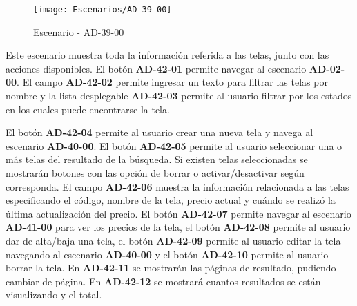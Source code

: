 \begin{figure}[H]
\centering
\texttt{[image: Escenarios/AD-39-00]}
\caption{Escenario - AD-39-00}
\label{fig:AD-39-00}
\end{figure}

Este escenario muestra toda la información referida a las telas, junto con las acciones disponibles.
El botón \textbf{AD-42-01} permite navegar al escenario \textbf{AD-02-00}. El campo \textbf{AD-42-02} permite ingresar un texto para filtrar las telas por nombre y la lista desplegable \textbf{AD-42-03} permite al usuario filtrar por los estados en los cuales puede encontrarse la tela.

El botón \textbf{AD-42-04} permite al usuario crear una nueva tela y navega al escenario \textbf{AD-40-00}.
El botón \textbf{AD-42-05} permite al usuario seleccionar una o más telas del resultado de la búsqueda. Si existen telas seleccionadas se mostrarán botones con las opción de borrar o activar/desactivar según corresponda. El campo \textbf{AD-42-06} muestra la información relacionada a las telas especificando el código, nombre de la tela, precio actual y cuándo se realizó la última actualización del precio. El botón \textbf{AD-42-07} permite navegar al escenario \textbf{AD-41-00} para ver los precios de la tela, el botón \textbf{AD-42-08} permite al usuario dar de alta/baja una tela, el botón \textbf{AD-42-09} permite al usuario editar la tela navegando al escenario \textbf{AD-40-00} y el botón \textbf{AD-42-10} permite al usuario borrar la tela. 
En \textbf{AD-42-11} se mostrarán las páginas de resultado, pudiendo cambiar de página. En \textbf{AD-42-12} se mostrará cuantos resultados se están visualizando y el total.
\clearpage
